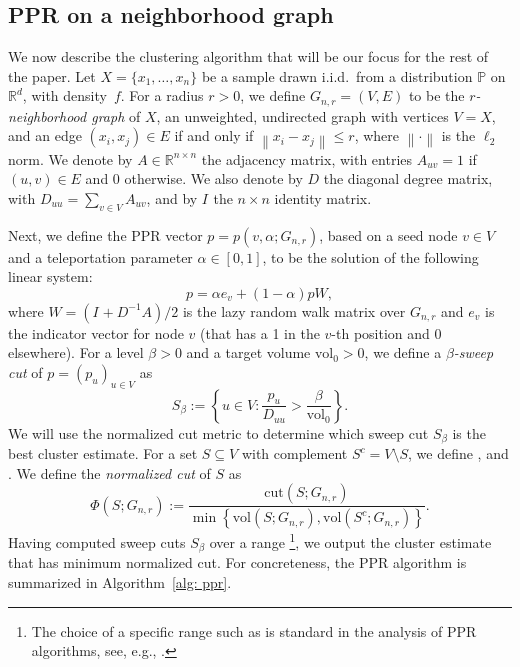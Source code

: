 \documentclass[11pt,twoside]{article}
\newcommand{\set}[1]{\left\{#1\right\}}
\newcommand{\vol}{\mathrm{vol}}
\newcommand{\cut}{\mathrm{cut}}
\newcommand{\Reals}{\mathbb{R}}
\newcommand{\Rd}{\Reals^d}
\newcommand{\norm}[1]{\left\lVert#1\right\rVert}
\newcommand{\1}{\mathbf{1}}
\newcommand{\pbf}{p}        %
\newcommand{\ebf}[1]{{e}_{#1}}
\newcommand{\Abf}{A}
\newcommand{\Xbf}{X}             %
\newcommand{\Wbf}{W}
\newcommand{\Dbf}{D}
\newcommand{\Ibf}[1]{I_{#1}}
\newcommand{\Pbb}{\mathbb{P}}
\newcommand{\Cest}{\widehat{C}}
\begin{document}
\subsection{PPR on a neighborhood graph} 
We now describe the clustering
algorithm that will be our focus for the rest of the paper. Let $\Xbf = \{x_1,
\ldots, x_n\}$ be a sample drawn i.i.d.\ from a distribution $\Pbb$ on $\Rd$,
with density~$f$.  For a radius $r > 0$, we define $G_{n,r}=(V,E)$ to be the
\emph{$r$-neighborhood graph} of $\Xbf$, an unweighted, undirected graph with
vertices $V=\Xbf$, and an edge $(x_i,x_j) \in E$ if and only if $\norm{x_i -
x_j} \leq r$, where $\norm{\cdot}$ is the $\ell_2$ norm. We denote by $\Abf \in
\Reals^{n \times n}$ the adjacency matrix, with entries $\Abf_{uv} = 1$ if
$(u,v) \in E$ and $0$ otherwise.  We also denote by $\Dbf$ the diagonal degree
matrix, with $\Dbf_{uu} = \sum_{v \in V} \Abf_{uv}$, and by $\Ibf{}$ the $n
\times n$ identity matrix.

Next, we define the PPR vector $\pbf = \pbf(v,\alpha;G_{n,r})$, based on
a seed node $v \in V$ and a teleportation parameter $\alpha \in [0,1]$, to be 
the solution of the following linear system:
\begin{equation}
\label{eqn: ppr_vector}
\pbf = \alpha \ebf{v} + (1 - \alpha) \pbf \Wbf,
\end{equation}
where $\Wbf = (\Ibf{} + \Dbf^{-1}\Abf)/2$ is the lazy random walk matrix over
$G_{n,r}$ and $e_{v}$ is the indicator vector for node $v$ (that has a 1 in the
$v$-th position and 0 elsewhere). For a level $\beta > 0$ and a target volume
$\vol_0 > 0$, we define a \emph{$\beta$-sweep cut} of $\pbf = (p_u)_{u \in V}$
as   
\begin{equation}
\label{eqn: sweep_cuts}
S_\beta := \set{u \in V: \frac{p_u}{\Dbf_{uu}} > \frac{\beta}{\vol_{0}}}.
\end{equation}
We will use the normalized cut metric to determine which sweep cut $S_{\beta}$
is the best cluster estimate. For a set $S \subseteq V$ with complement $S^c = V
\setminus S$, we define \smash{$\cut(S;G_{n,r}) := \sum_{u \in S, v \in S^c}
\Abf_{uv}$}, and \smash{$\vol(S; G_{n,r}) := \sum_{u \in S} \Dbf_{uu}$}.  We
define the \emph{normalized cut} of $S$ as
\begin{equation}
\label{eqn: normalized_cut}
\Phi(S; G_{n,r}) := \frac{\cut(S;G_{n,r})}{\min \set{\vol(S; G_{n,r}), \vol(S^c; G_{n,r})}}.
\end{equation}
Having computed sweep cuts $S_{\beta}$ over a range \footnote{The choice of a specific range such as  
 is standard in the analysis of PPR
algorithms, see, e.g., \citep{zhu2013}.}, we output the cluster estimate
\smash{$\Cest = S_{\beta^*}$} that has minimum normalized cut.
For concreteness, the PPR algorithm is summarized in Algorithm~\ref{alg: ppr}. 
\end{document}
